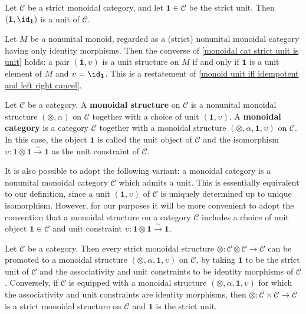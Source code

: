 \begin{example}\label{monoidal cat strict unit is unit}
Let $\mathcal{C}$ be a strict monoidal category, and let $\mathbf{1}\in\mathcal{C}$ be the strict unit. Then $(\mathbf{1},\id_{\mathbf{1}})$ is a unit of $\mathcal{C}$.
\end{example}
\begin{example}
Let $M$ be a nonunital monoid, regarded as a (strict) nonunital monoidal category having only identity morphisms. Then the converse of \cref{monoidal cat strict unit is unit} holds: a pair $(\mathbf{1},\upsilon)$ is a unit structure on $M$ if and only if $\mathbf{1}$ is a unit element of $M$ and $\upsilon=\id_{\mathbf{1}}$. This is a restatement of \cref{monoid unit iff idempotent and left right cancel}.
\end{example}
Let $\mathcal{C}$ be a category. A \textbf{monoidal structure} on $\mathcal{C}$ is a nonunital monoidal structure $(\otimes,\alpha)$ on $\mathcal{C}$ together with a choice of unit $(\mathbf{1},\upsilon)$. A \textbf{monoidal category} is a category $\mathcal{C}$ together with a monoidal structure $(\otimes,\alpha,\mathbf{1},\upsilon)$ on $\mathcal{C}$. In this case, the object $\mathbf{1}$ is called the unit object of $\mathcal{C}$ and the isomorphism $\upsilon:\mathbf{1}\otimes\mathbf{1}\stackrel{\sim}{\to}\mathbf{1}$ as the unit constraint of $\mathcal{C}$.
\begin{remark}
It is also possible to adopt the following variant: a monoidal category is a nonunital monoidal category $\mathcal{C}$ which admits a unit. This is essentially equivalent to our definition, since a unit $(\mathbf{1},\upsilon)$ of $\mathcal{C}$ is uniquely determined up to unique isomorphism. However, for our purposes it will be more convenient to adopt the convention that a monoidal structure on a category $\mathcal{C}$ includes a choice of unit object $\mathbf{1}\in\mathcal{C}$ and unit constraint $\upsilon:\mathbf{1}\otimes\mathbf{1}\stackrel{\sim}{\to}\mathbf{1}$.
\end{remark}
\begin{example}
Let $\mathcal{C}$ be a category. Then every strict monoidal structure $\otimes:\mathcal{C}\otimes\mathcal{C}\to\mathcal{C}$ can be promoted to a monoidal structure $(\otimes,\alpha,\mathbf{1},\upsilon)$ on $\mathcal{C}$, by taking $\mathbf{1}$ to be the strict unit of $\mathcal{C}$ and the associativity and unit constraints to be identity morphisms of $\mathcal{C}$. Conversely, if $\mathcal{C}$ is equipped with a monoidal structure $(\otimes,\alpha,\mathbf{1},\upsilon)$ for which the associativity and unit constraints are identity morphisms, then $\otimes:\mathcal{C}\times\mathcal{C}\to\mathcal{C}$ is a strict monoidal structure on $\mathcal{C}$ and $\mathbf{1}$ is the strict unit.
\end{example}
